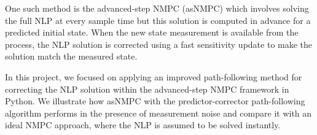 One such method is the advanced-step NMPC (asNMPC) which involves solving the full NLP at every sample time but this solution is computed in advance for a predicted initial state.
When the new state measurement is available from the process, the NLP solution is corrected using a fast sensitivity update to make the solution match the measured state.
\par
In this project, we focused on applying an improved path-following method for correcting the NLP solution within the advanced-step NMPC framework in Python. 
We illustrate how asNMPC with the predictor-corrector path-following algorithm performs in the presence of measurement noise and compare it with an ideal NMPC approach, where the NLP is assumed to be solved instantly.